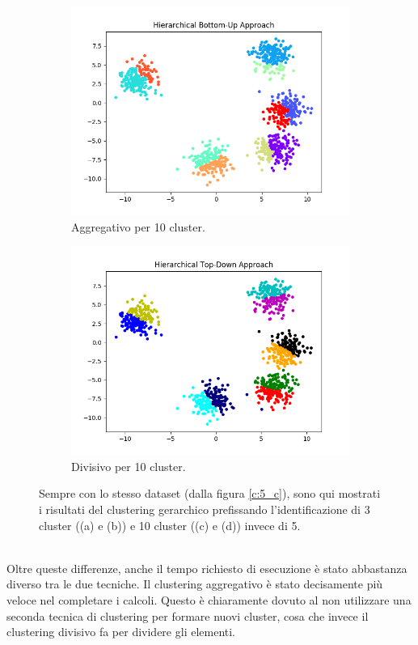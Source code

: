 \documentclass{llncs}
\begin{document}
\begin{figure}[h]
\begin{subfigure}{.5\textwidth}
			\includegraphics[width=\linewidth]{immagini/5_clusters_agg_10.png}
			\caption{Aggregativo per 10 cluster.}
			\label{hier:c}			
		  \end{subfigure}
		  \begin{subfigure}{.5\textwidth}
			\centering
			\includegraphics[width=\linewidth]{immagini/5_clusters_div_10.png}
			\caption{Divisivo per 10 cluster.}
			\label{hier:d}			
		  \end{subfigure}
		\caption{Sempre con lo stesso dataset (dalla figura \ref{c:5_c}), sono qui mostrati i risultati del clustering gerarchico prefissando
		l'identificazione di 3 cluster ((a) e (b)) e 10 cluster ((c) e (d)) invece di 5.}
		\label{hier:test}
	\end{figure}\\
	Oltre queste differenze, anche il tempo richiesto di esecuzione è stato abbastanza diverso tra le due tecniche. Il clustering aggregativo è stato
	decisamente più veloce nel completare i calcoli. Questo è chiaramente dovuto al non utilizzare una seconda tecnica di clustering per formare nuovi cluster, 
	cosa che invece il clustering divisivo fa per dividere gli elementi.
\end{document}
